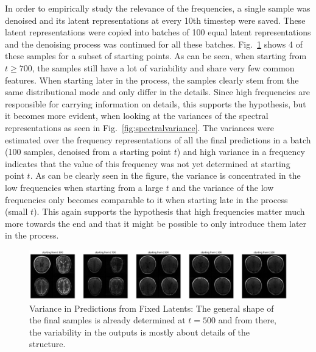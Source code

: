 In order to empirically study the relevance of the frequencies, a single sample was denoised and its latent representations at every 10th timestep were saved. These latent representations were copied into batches of 100 equal latent representations and the denoising process was continued for all these batches. Fig.~\ref{fig:predvariance} shows 4 of these samples for a subset of starting points. As can be seen, when starting from $t\geq700$, the samples still have a lot of variability and share very few common features. When starting later in the process, the samples clearly stem from the same distributional mode and only differ in the details. Since high frequencies are responsible for carrying information on details, this supports the hypothesis, but it becomes more evident, when looking at the variances of the spectral representations as seen in Fig.~\ref{fig:spectralvariance}. The variances were estimated over the frequency representations of all the final predictions in a batch (100 samples, denoised from a starting point $t$) and high variance in a frequency indicates that the value of this frequency was not yet determined at starting point $t$. As can be clearly seen in the figure, the variance is concentrated in the low frequencies when starting from a large $t$ and the variance of the low frequencies only becomes comparable to it when starting late in the process (small $t$). This again supports the hypothesis that high frequencies matter much more towards the end and that it might be possible to only introduce them later in the process.
\begin{figure}[h]
    \centering
    \includegraphics[width=\textwidth]{images/fixedlatents_variance.png}
    \caption[Variance in Predictions from Fixed Latents]{Variance in Predictions from Fixed Latents: The general shape of the final samples is already determined at $t=500$ and from there, the variability in the outputs is mostly about details of the structure.}
    \label{fig:predvariance}
\end{figure}

